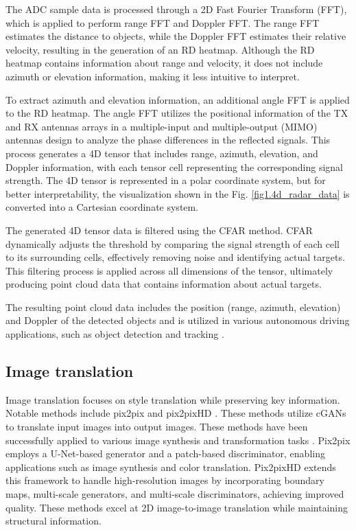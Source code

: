 The ADC sample data is processed through a 2D Fast Fourier Transform (FFT), which is applied to perform range FFT and Doppler FFT. The range FFT estimates the distance to objects, while the Doppler FFT estimates their relative velocity, resulting in the generation of an RD heatmap. Although the RD heatmap contains information about range and velocity, it does not include azimuth or elevation information, making it less intuitive to interpret.

To extract azimuth and elevation information, an additional angle FFT is applied to the RD heatmap. The angle FFT utilizes the positional information of the TX and RX antennas arrays in a multiple-input and multiple-output (MIMO) antennas design to analyze the phase differences in the reflected signals. This process generates a 4D tensor that includes range, azimuth, elevation, and Doppler information, with each tensor cell representing the corresponding signal strength. The 4D tensor is represented in a polar coordinate system, but for better interpretability, the visualization shown in the Fig. \ref{fig1.4d_radar_data} is converted into a Cartesian coordinate system.

The generated 4D tensor data is filtered using the CFAR method. CFAR dynamically adjusts the threshold by comparing the signal strength of each cell to its surrounding cells, effectively removing noise and identifying actual targets. This filtering process is applied across all dimensions of the tensor, ultimately producing point cloud data that contains information about actual targets.

The resulting point cloud data includes the position (range, azimuth, elevation) and Doppler of the detected objects and is utilized in various autonomous driving applications, such as object detection and tracking \cite{4dradar_tutorial, 4D_radar_survey, FFT-RadNet}.

\subsection{Image translation}

Image translation focuses on style translation while preserving key information. Notable methods include pix2pix \cite{pix2pix} and pix2pixHD \cite{pix2pixhd}. These methods utilize cGANs to translate input images into output images. These methods have been successfully applied to various image synthesis and transformation tasks \cite{radsimreal, l2r, radarpointgenerator1}. Pix2pix employs a U-Net-based generator and a patch-based discriminator, enabling applications such as image synthesis and color translation. Pix2pixHD extends this framework to handle high-resolution images by incorporating boundary maps, multi-scale generators, and multi-scale discriminators, achieving improved quality. These methods excel at 2D image-to-image translation while maintaining structural information.

